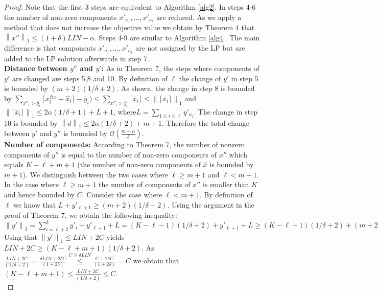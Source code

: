 \documentclass[a4paper,11pt]{article}
\newcommand{\nor}[1]{\left\|#1\right\|}
\begin{document}
\begin{proof}
	Note that the first 3 steps are equivalent to Algorithm \ref{alg2}. In steps 4-6 
	the number of non-zero components $x'_{a_1}, \ldots ,x'_{a_{\ell}}$ are reduced. As we apply
	a method that does not increase the objective value we obtain by
	Theorem 4 that $\nor{x''}_1 \leq (1+\delta) \mathit{LIN} - \alpha$. 
	Steps 4-9 are similar to Algorithm \ref{alg4}. The main
	difference is that components $x'_{a_1}, \ldots ,x'_{a_{\ell}}$ are not assigned by the LP but are added to the 
	LP solution	afterwards in step 7.\\
	{\bf Distance between $y''$ and $y'$:} As in Theorem 7, the steps where components of $y'$ are changed are steps 
	5,8 and 10. By definition of $\ell$ the change of $y'$ in step 5 is bounded by $(m+2)(1/ \delta +2)$.
	As shown, the change in step 8 is bounded by $\sum_{x''_i> \bar{y}_i} \lceil x^{fix}_i + \hat{x}_i \rceil - \bar{y}_i) 
	\leq \sum_{x''_i> \bar{y}_i}\lceil \bar{x}_i \rceil \leq \nor{\lceil \bar{x}_i \rceil}_1$ and 
	$\nor{\lceil \bar{x}_i \rceil}_1 \leq 2 \alpha (1/ \delta +1) + L+1$, where$L = \sum_{1\leq i \leq \ell} y'_{a_i}$.
	The change in step 10 is bounded by $\nor{d}_1 \leq 2 \alpha (1/ \delta +2)+ m +1$. Therefore the total change
	between $y'$ and $y''$ is bounded by $\mathcal{O}(\frac{m + \alpha}{\delta})$.\\
	{\bf Number of components:} According to Theorem 7, the number of nonzero components of $y''$ is equal to 
	the number of non-zero components of $x''$ which equals $K - \ell + m+1$ (the number of non-zero components of
	$\hat{x}$ is bounded by $m+1$). We distinguish between the
	two cases where $\ell \geq m+1$ and $\ell < m+1$. In the case where $\ell \geq m+1$ the number of components
	of $x''$ is smaller than $K$ and hence bounded by $C$. Consider the case where $\ell < m+1$.
	By definition of $\ell$ we know that $L + y'_{\ell +1}
	\geq (m+2)(1/ \delta +2)$.
	Using the argument in the proof of Theorem 7, we obtain the following inequality:
	$\nor{y'}_1 = \sum_{i= \ell +2}^k y'_i + y'_{\ell +1} + L = (K-\ell -1)(1 / \delta +2)+ y'_{\ell +1} +L 
	\geq (K- \ell-1 )(1 / \delta +2)+ (m+2)(1 / \delta +2) = (K-\ell+m +1)(1 / \delta +2)$
	Using that $\nor{y'}_1 \leq \mathit{LIN} + 2C$ yields
	$\mathit{LIN} + 2C \geq (K- \ell +m +1)(1 / \delta +2)$.
	As $\frac{\mathit{LIN} +2C}{(1 / \delta +2)} =\frac{ \delta\mathit{LIN} + 2 \delta C}{(1+2\delta)}
	\stackrel{C \geq \delta\mathit{LIN}}{\leq} \frac{C + 2 \delta C}{(1+ 2 \delta)} = C$ we obtain that 
	$(K- \ell +m +1) \leq \frac{\mathit{LIN} + 2C}{(1 / \delta +2)} \leq C$.\\

\end{proof}
\end{document}

